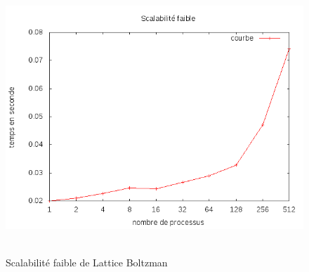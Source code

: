 \begin{figure}
\begin{center}
\includegraphics[height=4in]{cr/scalabilite_faible}
\caption{Scalabilité faible de Lattice Boltzman}
\end{center}
\end{figure}
